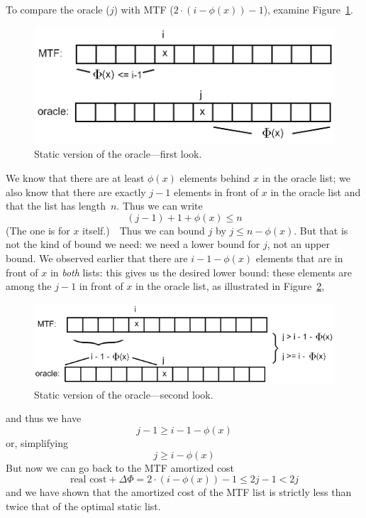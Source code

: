 \documentclass{article}
\begin{document}
To compare the oracle ($j$) with MTF ($2\cdot(i-\phi(x))-1$),
examine Figure~\ref{fig:figure2}.
\begin{figure}[h!]%
  \centering
    \includegraphics[scale = 0.5]{figures/figure2.png}%
  \caption{Static version of the oracle---first look.}%
  \label{fig:figure2}%
\end{figure}%
We know that there are at least $\phi(x)$ elements behind $x$ in the oracle
list; we also know that there are exactly $j-1$ elements in front of $x$
in the oracle list and that the list has length~$n$.  Thus we can write
  $$(j-1)+1+\phi(x)\leq n$$
(The one is for $x$ itself.)\ \ Thus we can bound $j$ by $j\leq n-\phi(x)$.
But that is not the kind of bound we need: we need a lower bound for $j$,
not an upper bound.  We observed earlier that there are $i-1-\phi(x)$
elements that are in front of $x$ in \emph{both} lists: this gives us
the desired lower bound: these elements are among the $j-1$ in front
of $x$ in the oracle list, as illustrated in Figure~\ref{fig:figure3},
\begin{figure}[h!]%
  \centering
    \includegraphics[scale = 0.5]{figures/figure3.png}%
  \caption{Static version of the oracle---second look.}%
  \label{fig:figure3}%
\end{figure}%
and thus we have
  $$j-1\geq i-1-\phi(x)$$
or, simplifying
  $$j\geq i-\phi(x)$$
But now we can go back to the MTF amortized cost
  $$\text{real cost} + \Delta\Phi = 2\cdot (i-\phi(x))-1 \leq 2j -1 < 2j$$
and we have shown that the amortized cost of the MTF list is strictly less
than twice that of the optimal static list.
\end{document}
